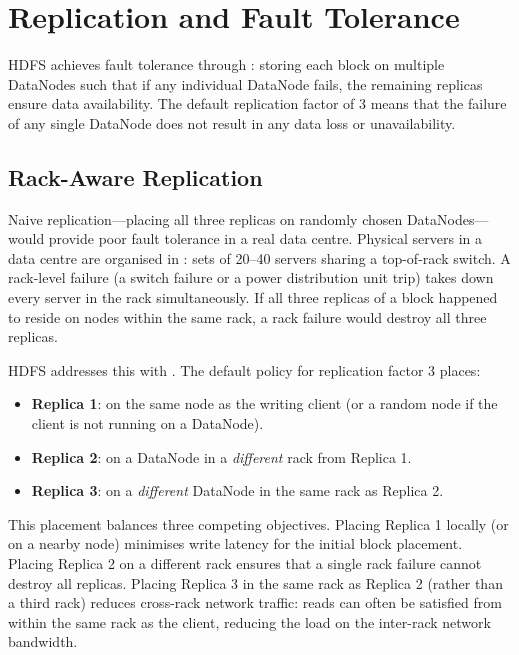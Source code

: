 \section{Replication and Fault Tolerance}
\label{sec:replication}

HDFS achieves fault tolerance through : storing
each block on multiple DataNodes such that if any individual DataNode
fails, the remaining replicas ensure data availability. The default
replication factor of 3 means that the failure of any single DataNode
does not result in any data loss or unavailability.

\subsection{Rack-Aware Replication}
\label{subsec:rack-aware}

Naive replication---placing all three replicas on randomly chosen
DataNodes---would provide poor fault tolerance in a real data centre.
Physical servers in a data centre are organised in : sets
of 20--40 servers sharing a top-of-rack switch. A rack-level failure
(a switch failure or a power distribution unit trip) takes down every
server in the rack simultaneously. If all three replicas of a block
happened to reside on nodes within the same rack, a rack failure would
destroy all three replicas.

HDFS addresses this with . The default
policy for replication factor 3 places:
\begin{itemize}
  \item \textbf{Replica 1}: on the same node as the writing client (or
        a random node if the client is not running on a DataNode).
  \item \textbf{Replica 2}: on a DataNode in a \emph{different} rack
        from Replica 1.
  \item \textbf{Replica 3}: on a \emph{different} DataNode in the same
        rack as Replica 2.
\end{itemize}

This placement balances three competing objectives. Placing Replica 1
locally (or on a nearby node) minimises write latency for the initial
block placement. Placing Replica 2 on a different rack ensures that a
single rack failure cannot destroy all replicas. Placing Replica 3 in
the same rack as Replica 2 (rather than a third rack) reduces cross-rack
network traffic: reads can often be satisfied from within the same rack
as the client, reducing the load on the inter-rack network bandwidth.

